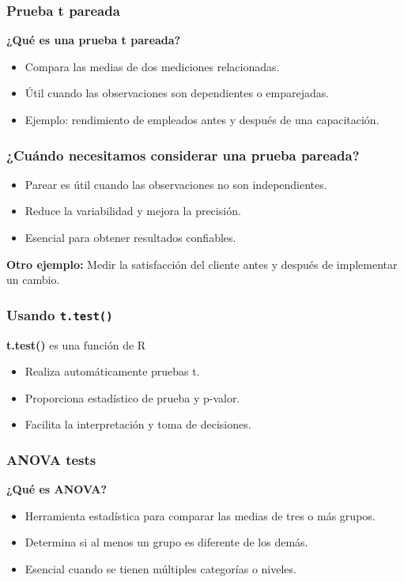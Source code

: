 \documentclass[aspectratio=169]{beamer}
\begin{document}
\begin{frame}
    \frametitle{Prueba t pareada}
    \textbf{¿Qué es una prueba t pareada?}
    \begin{itemize}
        \item Compara las medias de dos mediciones relacionadas.
        \item Útil cuando las observaciones son dependientes o emparejadas.
        \item Ejemplo: rendimiento de empleados antes y después de una capacitación.
    \end{itemize}

\end{frame}

\begin{frame}
    \frametitle{¿Cuándo necesitamos considerar una prueba pareada?}
    \begin{itemize}
        \item Parear es útil cuando las observaciones no son independientes.
        \item Reduce la variabilidad y mejora la precisión.
        \item Esencial para obtener resultados confiables.
    \end{itemize}

\vfill
    
    \textbf{Otro ejemplo:} Medir la satisfacción del cliente antes y después de implementar un cambio.
\end{frame}

\begin{frame}
    \frametitle{Usando \verb|t.test()|}

    \textbf{t.test()} es una función de R
    \begin{itemize}
        \item Realiza automáticamente pruebas t.
        \item Proporciona estadístico de prueba y p-valor.
        \item Facilita la interpretación y toma de decisiones.
    \end{itemize}

\end{frame}

\begin{frame}
    \frametitle{ANOVA tests}
    \textbf{¿Qué es ANOVA?}
    \begin{itemize}
        \item Herramienta estadística para comparar las medias de tres o más grupos.
        \item Determina si al menos un grupo es diferente de los demás.
        \item Esencial cuando se tienen múltiples categorías o niveles.
    \end{itemize}
\end{frame}
\end{document}
